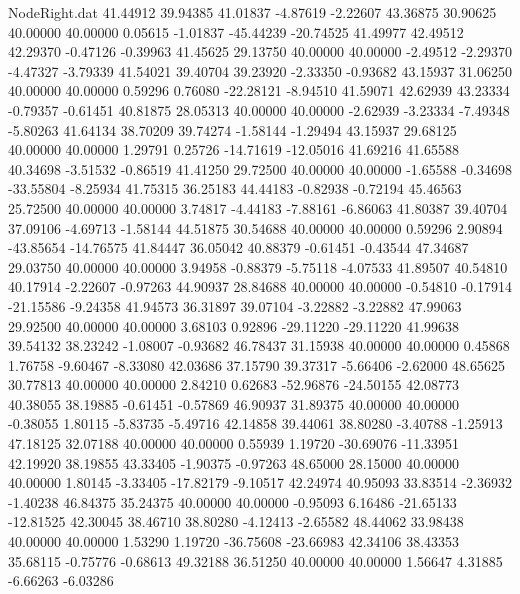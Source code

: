 \begin{filecontents}{NodeRight.dat}
  41.44912   39.94385   41.01837    -4.87619   -2.22607   43.36875   30.90625   40.00000   40.00000    0.05615   -1.01837  -45.44239  -20.74525
  41.49977   42.49512   42.29370    -0.47126   -0.39963   41.45625   29.13750   40.00000   40.00000   -2.49512   -2.29370   -4.47327   -3.79339
  41.54021   39.40704   39.23920    -2.33350   -0.93682   43.15937   31.06250   40.00000   40.00000    0.59296    0.76080  -22.28121   -8.94510
  41.59071   42.62939   43.23334    -0.79357   -0.61451   40.81875   28.05313   40.00000   40.00000   -2.62939   -3.23334   -7.49348   -5.80263
  41.64134   38.70209   39.74274    -1.58144   -1.29494   43.15937   29.68125   40.00000   40.00000    1.29791    0.25726  -14.71619  -12.05016
  41.69216   41.65588   40.34698    -3.51532   -0.86519   41.41250   29.72500   40.00000   40.00000   -1.65588   -0.34698  -33.55804   -8.25934
  41.75315   36.25183   44.44183    -0.82938   -0.72194   45.46563   25.72500   40.00000   40.00000    3.74817   -4.44183   -7.88161   -6.86063
  41.80387   39.40704   37.09106    -4.69713   -1.58144   44.51875   30.54688   40.00000   40.00000    0.59296    2.90894  -43.85654  -14.76575
  41.84447   36.05042   40.88379    -0.61451   -0.43544   47.34687   29.03750   40.00000   40.00000    3.94958   -0.88379   -5.75118   -4.07533
  41.89507   40.54810   40.17914    -2.22607   -0.97263   44.90937   28.84688   40.00000   40.00000   -0.54810   -0.17914  -21.15586   -9.24358
  41.94573   36.31897   39.07104    -3.22882   -3.22882   47.99063   29.92500   40.00000   40.00000    3.68103    0.92896  -29.11220  -29.11220
  41.99638   39.54132   38.23242    -1.08007   -0.93682   46.78437   31.15938   40.00000   40.00000    0.45868    1.76758   -9.60467   -8.33080
  42.03686   37.15790   39.37317    -5.66406   -2.62000   48.65625   30.77813   40.00000   40.00000    2.84210    0.62683  -52.96876  -24.50155
  42.08773   40.38055   38.19885    -0.61451   -0.57869   46.90937   31.89375   40.00000   40.00000   -0.38055    1.80115   -5.83735   -5.49716
  42.14858   39.44061   38.80280    -3.40788   -1.25913   47.18125   32.07188   40.00000   40.00000    0.55939    1.19720  -30.69076  -11.33951
  42.19920   38.19855   43.33405    -1.90375   -0.97263   48.65000   28.15000   40.00000   40.00000    1.80145   -3.33405  -17.82179   -9.10517
  42.24974   40.95093   33.83514    -2.36932   -1.40238   46.84375   35.24375   40.00000   40.00000   -0.95093    6.16486  -21.65133  -12.81525
  42.30045   38.46710   38.80280    -4.12413   -2.65582   48.44062   33.98438   40.00000   40.00000    1.53290    1.19720  -36.75608  -23.66983
  42.34106   38.43353   35.68115    -0.75776   -0.68613   49.32188   36.51250   40.00000   40.00000    1.56647    4.31885   -6.66263   -6.03286

\end{filecontents}
